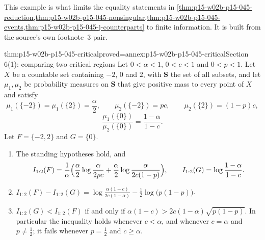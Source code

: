 This example is what limits the equality statements in
\cref{thm:p15-w02b-p15-045-reduction,thm:p15-w02b-p15-045-nonsingular,thm:p15-w02b-p15-045-events,thm:p15-w02b-p15-045-j-counterparts}
to finite information. It is built from the source's own footnote~3 pair.

\begin{hbtheorem}{thm:p15-w02b-p15-045-critical}{proved=annex:p15-w02b-p15-045-critical}{Section 6(1): comparing two critical regions}
Let \(0<\alpha<1\), \(0<c<1\) and \(0<p<1\). Let \(X\) be a countable
set containing \(-2\), \(0\) and \(2\), with \(\mathbf S\) the set of
all subsets, and let \(\mu_1,\mu_2\) be probability measures on
\(\mathbf S\) that give positive mass to every point of \(X\) and satisfy
\[
  \mu_1(\{-2\})=\mu_1(\{2\})=\frac\alpha2,\qquad
  \mu_2(\{-2\})=pc,\qquad
  \mu_2(\{2\})=(1-p)c,
\]
\[
  \frac{\mu_1(\{0\})}{\mu_2(\{0\})}=\frac{1-\alpha}{1-c}.
\]
Let \(F=\{-2,2\}\) and \(G=\{0\}\).
\begin{enumerate}
\item The standing hypotheses hold, and
\[
  I_{1:2}(F)=\frac1\alpha\Bigl(\frac\alpha2\log\frac\alpha{2pc}
             +\frac\alpha2\log\frac\alpha{2c(1-p)}\Bigr),\qquad
  I_{1:2}(G)=\log\frac{1-\alpha}{1-c}.
\]
\item
\(\displaystyle I_{1:2}(F)-I_{1:2}(G)=\log\frac{\alpha(1-c)}{2c(1-\alpha)}-\frac12\log\bigl(p(1-p)\bigr)\).
\item \(I_{1:2}(G)<I_{1:2}(F)\) if and only if
\(\alpha(1-c)>2c(1-\alpha)\sqrt{p(1-p)}\). In particular the inequality
holds whenever \(c<\alpha\), and whenever \(c=\alpha\) and
\(p\neq\tfrac12\); it fails whenever \(p=\tfrac12\) and \(c\geq\alpha\).
\end{enumerate}
\end{hbtheorem}


